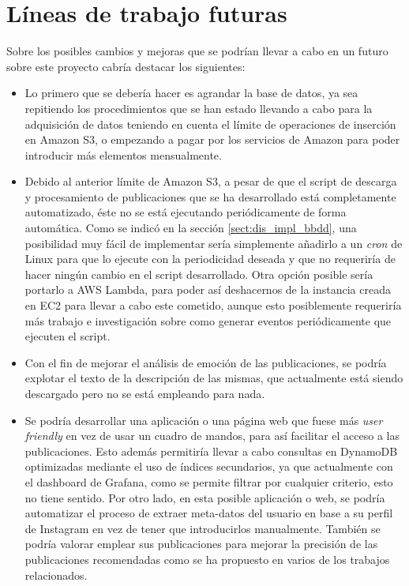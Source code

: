 \section{Líneas de trabajo futuras}

Sobre los posibles cambios y mejoras que se podrían llevar a cabo en un futuro sobre este proyecto cabría destacar los siguientes:

\begin{itemize}
    \item Lo primero que se debería hacer es agrandar la base de datos, ya sea repitiendo los procedimientos que se han estado llevando a cabo para la adquisición de datos teniendo en cuenta el límite de operaciones de inserción en Amazon S3, o empezando a pagar por los servicios de Amazon para poder introducir más elementos mensualmente.
    \item Debido al anterior límite de Amazon S3, a pesar de que el script de descarga y procesamiento de publicaciones que se ha desarrollado está completamente automatizado, éste no se está ejecutando periódicamente de forma automática. Como se indicó en la sección \ref{sect:dis_impl_bbdd}, una posibilidad muy fácil de implementar sería simplemente añadirlo a un \textit{cron} de Linux para que lo ejecute con la periodicidad deseada y que no requeriría de hacer ningún cambio en el script desarrollado. Otra opción posible sería portarlo a AWS Lambda, para poder así deshacernos de la instancia creada en EC2 para llevar a cabo este cometido, aunque esto posiblemente requeriría más trabajo e investigación sobre como generar eventos periódicamente que ejecuten el script.
    \item Con el fin de mejorar el análisis de emoción de las publicaciones, se podría explotar el texto de la descripción de las mismas, que actualmente está siendo descargado pero no se está empleando para nada.
    \item Se podría desarrollar una aplicación o una página web que fuese más \textit{user friendly} en vez de usar un cuadro de mandos, para así facilitar el acceso a las publicaciones. Esto además permitiría llevar a cabo consultas en DynamoDB optimizadas mediante el uso de índices secundarios, ya que actualmente con el dashboard de Grafana, como se permite filtrar por cualquier criterio, esto no tiene sentido. Por otro lado, en esta posible aplicación o web, se podría automatizar el proceso de extraer meta-datos del usuario en base a su perfil de Instagram en vez de tener que introducirlos manualmente. También se podría valorar emplear sus publicaciones para mejorar la precisión de las publicaciones recomendadas como se ha propuesto en varios de los trabajos relacionados.
\end{itemize}
